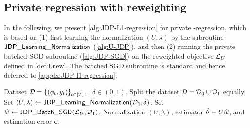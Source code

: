 \subsection{Private regression with reweighting}\label{ssec:L1-regression-rates}


In the following, we present \cref{alg:JDP-L1-regression} for private \Lone-regression, which is based on (1) first learning the normalization $(U,\lambda)$ by the subroutine $\mathsf{JDP\_Learning\_Normalization}$ (\cref{alg:U-JDP}), and then (2) running the private batched SGD subroutine (\cref{alg:JDP-SGD}) on the reweighted objective $\mathcal{L}_{U}$ defined in \eqref{def:Lnew}. The batched SGD subroutine is standard and hence deferred to \cref{appdx:JDP-l1-regression}.

\newcommand{\lamgd}{\uline{\boldsymbol{\epsilon}}}
\newcommand{\lamall}{\overline{\boldsymbol{\epsilon}}}

\begin{algorithm}
\caption{$\AlgJDPRegression$ %
}\label{alg:JDP-L1-regression}
\begin{algorithmic}[1]
\REQUIRE Dataset $\mathcal{D}=\left\{(\phi_t,y_t)\right\}_{t\in[T]}$, \errpara~$\delta\in(0,1)$.
\STATE Split the dataset $\mathcal{D}=\mathcal{D}_0 \cup \mathcal{D}_1$ equally.
\STATE Set $(U,\lambda) \leftarrow \mathsf{JDP\_Learning\_Normalization}(\mathcal{D}_0,\delta)$.
\STATE Set $\widehat{w}\leftarrow \mathsf{JDP\_Batch\_SGD}(\mathcal{L}_{U},\mathcal{D}_1)$.
\ENSURE Normalization $(U,\lambda)$, estimator $\hat{\theta}=U\widehat{w}$, and estimation error $\lamall$.
\end{algorithmic}
\end{algorithm}







